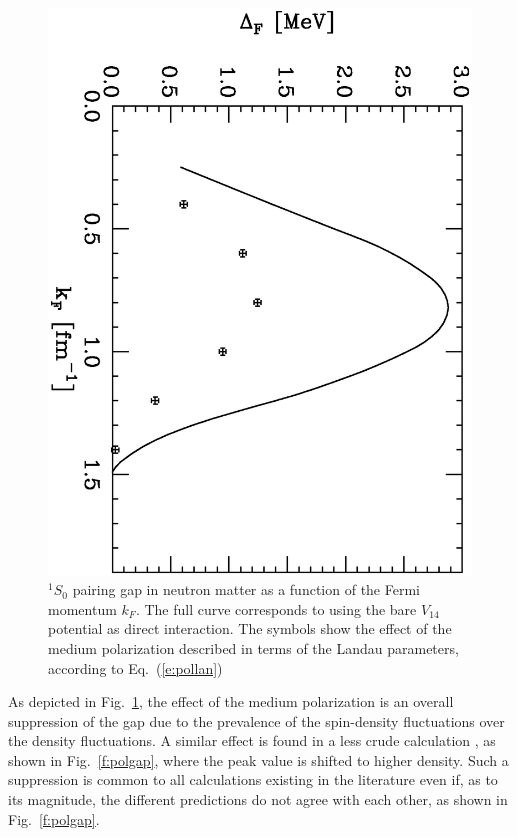 \documentclass[runningheads]{svmult}
\def\ss{^1\!S_0}
\begin{document}
\begin{figure}[t] %
\includegraphics[height=.32\textheight,angle=90,bb=70 350 500 700]
{nsbk_dpo.ps}
\caption[]{
$\ss$ pairing gap in neutron matter as a function of the Fermi momentum $k_F$.
The full curve corresponds to using the bare $V_{14}$ potential as direct 
interaction.
The symbols show the effect of the medium polarization described in terms of 
the Landau parameters, according to Eq.~(\ref{e:pollan})}
\label{f:landgap}  
\end{figure} %
 
As depicted in Fig.~\ref{f:landgap}, the effect of the medium polarization 
is an overall suppression of the gap due to the prevalence of the spin-density 
fluctuations over the density fluctuations. 
A similar effect is found in a less crude calculation \cite{SCHU}, 
as shown in Fig.~\ref{f:polgap},
where the peak value is shifted to higher density. 
Such a suppression is common to all calculations existing in the literature 
even if, as to its magnitude, the different predictions do not agree with 
each other, as shown in Fig.~\ref{f:polgap}. 
\end{document}
